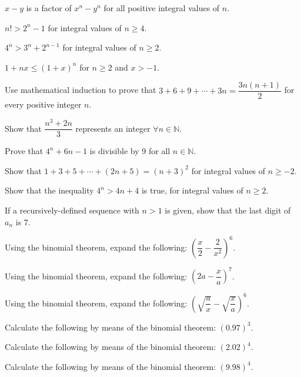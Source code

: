 \documentclass[11pt,a4paper]{article}
\begin{document}
\begin{shortlist}
\item $x-y$ is a factor of $x^n-y^n$ for all positive integral values of $n$.

\item $n!>2^n-1$ for integral values of $n\geq 4$.

\item $4^n>3^n+2^{n-1}$ for integral values of $n\geq 2$.

\item $1+nx\leq(1+x)^n$ for $n\geq 2$ and $x>-1$.

\item Use mathematical induction to prove that $3+6+9+\cdots+3n=\dfrac{3n(n+1)}{2}$ for every positive integer $n$.

\item Show that $\dfrac{n^3+2n}{3}$ represents an integer $\forall n\in\mathbb{N}$.

\item Prove that $4^n+6n-1$ is divisible by 9 for all $n\in\mathbb{N}$.

\item Show that $1+3+5+\cdots+(2n+5)=(n+3)^2$ for integral values of $n\geq -2$.

\item Show that the inequality $4^n>4n+4$ is true, for integral values of $n\geq 2$.

\item If a recursively-defined sequence with $n>1$ is given, show that the last digit of $a_n$ is 7.

\item Using the binomial theorem, expand the following: $\left(\dfrac{x}{2}-\dfrac{2}{x^2}\right)^6$.

\item Using the binomial theorem, expand the following: $\left(2a-\dfrac{x}{a}\right)^7$.

\item Using the binomial theorem, expand the following: $\left(\sqrt{\dfrac{a}{x}}-\sqrt{\dfrac{x}{a}}\right)^6$.

\item Calculate the following by means of the binomial theorem: $(0.97)^3$.

\item Calculate the following by means of the binomial theorem: $(2.02)^4$.

\item Calculate the following by means of the binomial theorem: $(9.98)^4$.


\end{shortlist}
\end{document}
